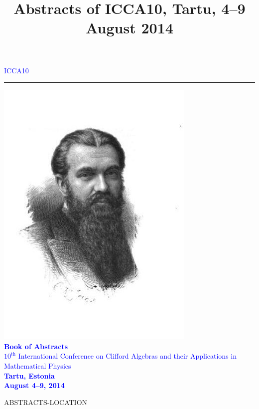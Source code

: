\documentclass[10pt,a5paper]{book}
\begin{document}
\begin{titlepage}

   \begin{center}
      \textcolor{blue}{ \Huge{ICCA10} }
      \textcolor{blue}{ \rule[1mm]{10.1cm}{0.7pt} } 
      \includegraphics[scale=2]{clifford_large.jpg}\\      
      \textcolor{blue}{ \huge{\textbf{Book of Abstracts}} } \\
      \vspace{1cm}
      \textcolor{blue}{ \Large{$10^{\text{th}}$ International Conference on Clifford Algebras and their Applications in Mathematical Physics} } \\
      \vspace{1.4cm}
      \textcolor{blue}{ \small{\textbf{Tartu, Estonia \\ August 4–9, 2014}} }\\
   \end{center}
\end{titlepage}

\tableofcontents

\title{Abstracts of ICCA10, Tartu, 4–9 August 2014}

\newpage

ABSTRACTS-LOCATION
\end{document}
